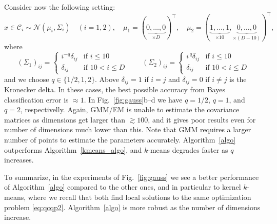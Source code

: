\documentclass[aps,preprint,nofootinbib,floatfix]{revtex4-1}
\newcommand\C{{\mathcal{C}}}
\begin{document}
Consider now the following setting:
\begin{equation}
\label{eq:gauss2}
x \in \C_i  \sim 
\mathcal{N}(\mu_i,\Sigma_i) \quad (i=1,2),  \quad
\mu_1 = (\underbrace{0,\dotsc,0}_{\times D})^\top , \quad
\mu_2 = (\underbrace{1,\dots,1}_{\times 10},
\underbrace{0,\dots,0}_{\times (D-10)})^\top, 
\end{equation}
where
\begin{equation}
\label{eq:cov}
(\Sigma_1)_{ij} = \begin{cases}
i^{-q} \delta_{ij} & \mbox{if $i \le 10$} \\
\delta_{ij} & \mbox{if $10 < i \le D$}
\end{cases} \qquad
(\Sigma_2)_{ij} = \begin{cases}
i^{\,q} \delta_{ij} & \mbox{if $i \le 10$} \\
\delta_{ij} & \mbox{if $10 < i \le D$}
\end{cases} 
\end{equation}
and we choose $q \in \{ 1/2, 1, 2\}$. Above $\delta_{ij} = 1$ if $i=j$ and
$\delta_{ij}=0$ if $i\ne j$ is the Kronecker delta. In these cases,
the best possible accuracy from Bayes classification error is $\approx 1$.
In Fig.~\ref{fig:gauss}b--d we have $q=1/2$, $q=1$, and $q=2$, respectivelly.
Again, GMM/EM is unable to estimate the covariance matrices
as dimensions get larger than $\gtrsim 100$, and it gives poor results even
for number of dimensions much lower than this. Note that GMM requires
a larger number of points to estimate the parameters accurately.
Algorithm~\ref{algo} outperforms
Algorithm~\ref{kmeans_algo}, and $k$-means degrades faster as 
$q$ increases.

To summarize, in the experiments of Fig.~\ref{fig:gauss}
we see a better performance of Algorithm~\ref{algo} compared
to the other ones, and in particular to kernel $k$-means,
where we recall that both find local solutions
to the same optimization problem \eqref{eq:qcqp2}.
Algorithm~\ref{algo} is more robust as the number of dimensions
increase.
\end{document}
